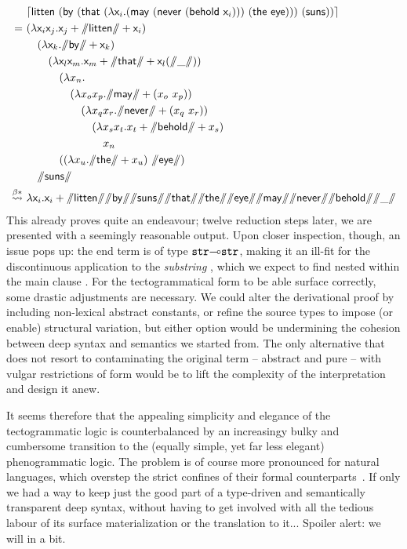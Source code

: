 {\smaller
\begin{equation}\label{equation:acg_pheno}
	\begin{aligned}
	& 			\hm{\term{litten~(by~(that~(\lam \vari .(may~(never~(behold~\vari )))~(the~eye)))~(suns))}} \\
	= \ 
	&							(\lam \vari\varj.\varj + \str{litten}+ \vari) \\
	&\quad								(\lam \vark.\str{by}+ \vark)\\
	&\qquad									(\lam \varl\varm. \varm + \str{that} + \varl(\str{\gap}))\\
	&\qqquad								(\lam x_n. \\
	&\qqquad\quad										(\lam x_o x_p.\str{may}+(x_o ~x_p))\\
	&\qqquad\qquad											(\lam x_q x_r.\str{never}+(x_q~x_r))\\
	&\qqquad\qqquad												(\lam x_sx_t.x_t+\str{behold}+x_s)\\
	&\qqquad\qqqquad												x_n \\
	&\qqquad												((\lam x_u.\str{the}+x_u)~\str{eye})\\
	&\quad									\str{suns}\\
	\bredstar \ & \term{\lam \vari.\vari + \str{litten}\str{by}\str{suns}\str{that}\str{the}\str{eye}\str{may}\str{never}\str{behold}}\str{\gap}
	\end{aligned}
\end{equation}
}%
This already proves quite an endeavour; twelve reduction steps later, we are presented with a seemingly reasonable output.
Upon closer inspection, though, an issue pops up: the end term is of type $\mathtt{str}\li\mathtt{str}$, making it an ill-fit for the discontinuous application to the \textit{substring} , which we expect to find nested within the main clause .
For the tectogrammatical form to be able surface correctly, some drastic adjustments are necessary.
We could alter the derivational proof by including non-lexical abstract constants, or refine the source types to impose (or enable) structural variation, but either option would be undermining the cohesion between deep syntax and semantics we started from.
The only alternative that does not resort to contaminating the original term -- abstract and pure -- with vulgar restrictions of form would be to lift the complexity of the interpretation and design it anew.

It seems therefore that the appealing simplicity and elegance of the tectogrammatic logic is counterbalanced by an increasingy bulky and cumbersome transition to the (equally simple, yet far less elegant) phenogrammatic logic.
The problem is of course more pronounced for natural languages, which overstep the strict confines of their formal counterparts~\cite{moot2014hybrid}.
If only we had a way to keep just the good part of a type-driven and semantically transparent deep syntax, without having to get involved with all the tedious labour of its surface materialization or the translation to it...
Spoiler alert: we will in a bit.

